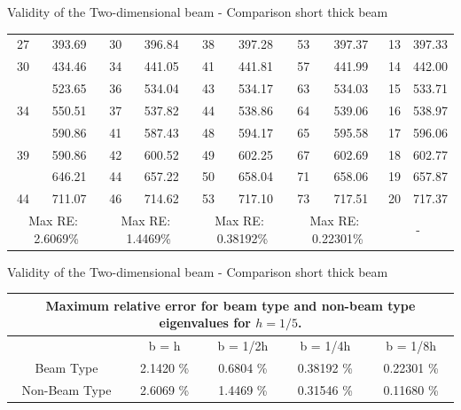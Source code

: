 \documentclass[8pt]{beamer}
\begin{document}
\begin{frame}{Validity of the Two-dimensional beam - Comparison short thick beam}
\begin{table}[htbp]
{{\begin{tabular}{|cc|cc|cc|cc||cc|}
                        {27} & 393.69 & {30} & 396.84 & {38} & 397.28 & {53} & 397.37 & 13    & 397.33 \\
                        {30} & 434.46 & {34} & 441.05 & {41} & 441.81 & {57} & 441.99 & 14    & 442.00 \\
                        \rowcolor{lightgray}{31} & 523.65 & {36} & 534.04 & {43} & 534.17 & {63} & 534.03 & 15    & 533.71 \\
                        {34} & 550.51 & {37} & 537.82 & {44} & 538.86 & {64} & 539.06 & 16    & 538.97 \\
                        \rowcolor{lightgray}{37} & 590.86 & {41} & 587.43 & {48} & 594.17 & {65} & 595.58 & 17    & 596.06 \\
                        {39} & 590.86 & {42} & 600.52 & {49} & 602.25 & {67} & 602.69 & 18    & 602.77 \\
                        \rowcolor{lightgray}{42} & 646.21 & {44} & 657.22 & {50} & 658.04 & {71} & 658.06 & 19    & 657.87 \\
                        {44} & 711.07 & {46} & 714.62 & {53} & 717.10 & {73} & 717.51 & 20    & 717.37 \\
                        \hline
                        \hline
                        \multicolumn{2}{|c|}{Max RE: \  2.6069\%} &\multicolumn{2}{c|}{Max RE: \ 1.4469\%}  & \multicolumn{2}{c|}{Max RE: \  0.38192\%}  & \multicolumn{2}{c||}{Max RE: \ 0.22301\%}& \multicolumn{2}{c|}{-} \\
                        \hline
                    \end{tabular}%
                    \label{tab:2v3_1}%
                }}
            \end{table}%
        \end{frame}

        \begin{frame}{Validity of the Two-dimensional beam - Comparison short thick beam}
            \begin{table}[htbp]
                \centering
                \begin{tabular}{|c|cccc|}
                    \hline
                    \multicolumn{5}{|c|}{Maximum relative error for beam type and non-beam type eigenvalues for $h = 1/5$.} \\
                    \hline
                    \hline
                    & {b = h} & {b = 1/2h} & {b = 1/4h} & {b = 1/8h} \\
                    \hline
                    Beam Type & 2.1420 \% & 0.6804 \% & 0.38192 \% & 0.22301 \% \\
                    Non-Beam Type & 2.6069 \% & 1.4469 \% & 0.31546 \% & 0.11680 \% \\
                    \hline
                \end{tabular}%
                \label{tab:2Dv3D_1_breakup}%
            \end{table}%
        \end{frame}
\end{document}
